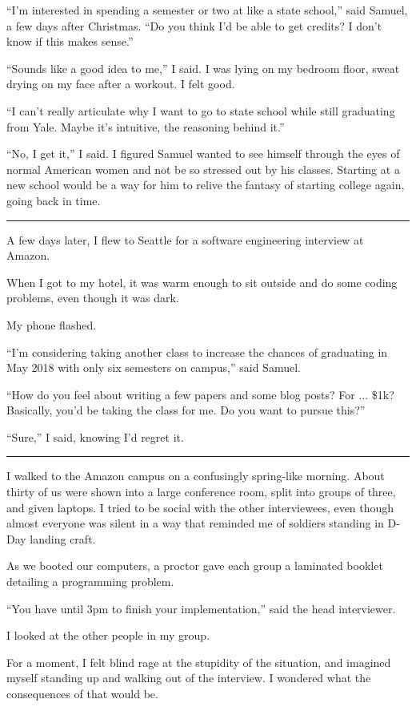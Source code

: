 ``I'm interested in spending a semester or two at like a state school,'' said
Samuel, a few days after Christmas.  ``Do you think I'd be able to get credits?
I don't know if this makes sense.''

``Sounds like a good idea to me,'' I said.  I was lying on my bedroom floor,
sweat drying on my face after a workout.  I felt good.

``I can't really articulate why I want to go to state school while still
graduating from Yale.   Maybe it's intuitive, the reasoning behind it.'' 

``No, I get it,'' I said.  I figured Samuel wanted to see himself through the
eyes of normal American women and not be so stressed out by his classes.
Starting at a new school would be a way for him to relive the fantasy of
starting college again, going back in time.  

\plainfancybreak{12pt}{2}{* * *}

A few days later, I flew to Seattle for a software engineering interview at
Amazon.

When I got to my hotel, it was warm enough to sit outside and do some coding
problems, even though it was dark.

My phone flashed.

``I'm considering taking another class to increase the chances of graduating in
May 2018 with only six semesters on campus,'' said Samuel.  

``How do you feel about writing a few papers and some blog posts?  For ... \$1k?
Basically, you'd be taking the class for me.  Do you want to pursue this?'' 

``Sure,'' I said, knowing I'd regret it.

\plainfancybreak{12pt}{2}{* * *}

I walked to the Amazon campus on a confusingly spring-like morning.  About
thirty of us were shown into a large conference room, split into groups of
three, and given laptops.  I tried to be social with the other interviewees,
even though almost everyone was silent in a way that reminded me of soldiers
standing in D-Day landing craft.

As we booted our computers, a proctor gave each group a laminated booklet
detailing a programming problem. 

``You have until 3pm to finish your implementation,'' said the head interviewer.

I looked at the other people in my group. 

For a moment, I felt blind rage at the stupidity of the situation, and imagined
myself standing up and walking out of the interview.  I wondered what the
consequences of that would be.  

